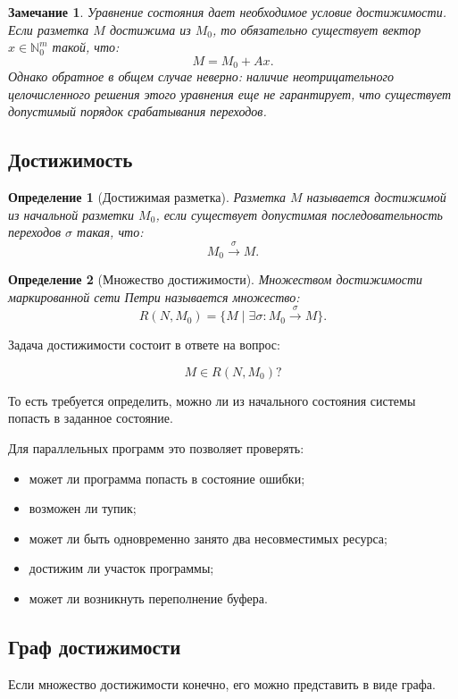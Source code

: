 \documentclass[12pt,a4paper]{article}
\newtheorem{definition}{Определение}
\newtheorem{remark}{Замечание}
\begin{document}
\begin{remark}
Уравнение состояния дает необходимое условие достижимости. Если разметка $M$ достижима из $M_0$, то обязательно существует вектор $x \in \mathbb{N}_0^m$ такой, что:
\[
M = M_0 + Ax.
\]
Однако обратное в общем случае неверно: наличие неотрицательного целочисленного решения этого уравнения еще не гарантирует, что существует допустимый порядок срабатывания переходов.
\end{remark}

\subsection{Достижимость}

\begin{definition}[Достижимая разметка]
Разметка $M$ называется достижимой из начальной разметки $M_0$, если существует допустимая последовательность переходов $\sigma$ такая, что:
\[
M_0 \xrightarrow{\sigma} M.
\]
\end{definition}

\begin{definition}[Множество достижимости]
Множеством достижимости маркированной сети Петри называется множество:
\[
R(N,M_0)
=
\{M \mid \exists \sigma: M_0 \xrightarrow{\sigma} M\}.
\]
\end{definition}

Задача достижимости состоит в ответе на вопрос:

\[
M \in R(N,M_0)?
\]

То есть требуется определить, можно ли из начального состояния системы попасть в заданное состояние.

Для параллельных программ это позволяет проверять:
\begin{itemize}
    \item может ли программа попасть в состояние ошибки;
    \item возможен ли тупик;
    \item может ли быть одновременно занято два несовместимых ресурса;
    \item достижим ли участок программы;
    \item может ли возникнуть переполнение буфера.
\end{itemize}

\subsection{Граф достижимости}

Если множество достижимости конечно, его можно представить в виде графа.
\end{document}
